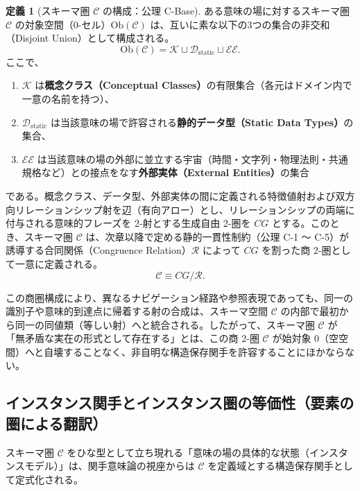 \documentclass[11pt,a4paper]{ltjsarticle}
\theoremstyle{definition}
\newtheorem{definition}{定義}[section]
\theoremstyle{plain}
\theoremstyle{remark}
\newcommand{\Ob}{\mathrm{Ob}}
\newcommand{\Dstatic}{\mathcal{D}_{\mathrm{static}}}
\begin{document}
\begin{definition}[スキーマ圏 $\mathcal{C}$ の構成：公理 C-Base]\label{def:schema-cat}
ある意味の場に対するスキーマ圏 $\mathcal{C}$ の対象空間（0-セル）$\Ob(\mathcal{C})$ は、互いに素な以下の3つの集合の非交和（Disjoint Union）として構成される。
\begin{equation}
\Ob(\mathcal{C}) = \mathcal{K} \sqcup \Dstatic \sqcup \mathcal{EE}.
\end{equation}
ここで、
\begin{enumerate}
    \item $\mathcal{K}$ は\textbf{概念クラス（Conceptual Classes）}の有限集合（各元はドメイン内で一意の名前を持つ）、
    \item $\Dstatic$ は当該意味の場で許容される\textbf{静的データ型（Static Data Types）}の集合、
    \item $\mathcal{EE}$ は当該意味の場の外部に並立する宇宙（時間・文字列・物理法則・共通規格など）との接点をなす\textbf{外部実体（External Entities）}の集合
\end{enumerate}
である。概念クラス、データ型、外部実体の間に定義される特徴値射および双方向リレーションシップ射を辺（有向アロー）とし、リレーションシップの両端に付与される意味的フレーズを 2-射とする生成自由 2-圏を $CG$ とする。このとき、スキーマ圏 $\mathcal{C}$ は、次章以降で定める静的一貫性制約（公理 C-1 〜 C-5）が誘導する合同関係（Congruence Relation）$\mathcal{R}$ によって $CG$ を割った商 2-圏として一意に定義される。
\begin{equation}
\mathcal{C} \equiv CG / \mathcal{R}.
\end{equation}
\end{definition}

この商圏構成により、異なるナビゲーション経路や参照表現であっても、同一の識別子や意味的到達点に帰着する射の合成は、スキーマ空間 $\mathcal{C}$ の内部で最初から同一の同値類（等しい射）へと統合される。したがって、スキーマ圏 $\mathcal{C}$ が「無矛盾な実在の形式として存在する」とは、この商 2-圏 $\mathcal{C}$ が始対象 $0$（空空間）へと自壊することなく、非自明な構造保存関手を許容することにほかならない。

\subsection{インスタンス関手とインスタンス圏の等価性（要素の圏による翻訳）}
スキーマ圏 $\mathcal{C}$ をひな型として立ち現れる「意味の場の具体的な状態（インスタンスモデル）」は、関手意味論の視座からは $\mathcal{C}$ を定義域とする構造保存関手として定式化される。
\end{document}
